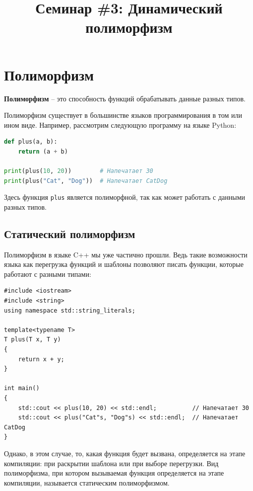 \documentclass{article}
\begin{document}
\title{Семинар \#3: Динамический полиморфизм \vspace{-5ex}}\date{}\maketitle

\section{Полиморфизм}
\textbf{Полиморфизм} -- это способность функций обрабатывать данные разных типов.

Полиморфизм существует в большинстве языков программирования в том или ином виде. Например, рассмотрим следующую программу на языке Python:
\begin{lstlisting}[language=Python]
def plus(a, b):
    return (a + b)

print(plus(10, 20))        # Напечатает 30
print(plus("Cat", "Dog"))  # Напечатает CatDog
\end{lstlisting}
Здесь функция \texttt{plus} является полиморфной, так как может работать с данными разных типов.

\subsection*{Статический полиморфизм}
Полиморфизм в языке C++ мы уже частично прошли. Ведь такие возможности языка как перегрузка функций и шаблоны позволяют писать функции, которые работают с разными типами:
\begin{lstlisting}[style=csMiptCppStyle]
#include <iostream>
#include <string>
using namespace std::string_literals;

template<typename T>
T plus(T x, T y)
{
	return x + y;
}

int main()
{
	std::cout << plus(10, 20) << std::endl;          // Напечатает 30
	std::cout << plus("Cat"s, "Dog"s) << std::endl;  // Напечатает CatDog
}
\end{lstlisting}
Однако, в этом случае, то, какая функция будет вызвана, определяется на этапе компиляции: при раскрытии шаблона или при выборе перегрузки. Вид полиморфизма, при котором вызываемая функция определяется на этапе компиляции, называется статическим полиморфизмом. 
\end{document}
